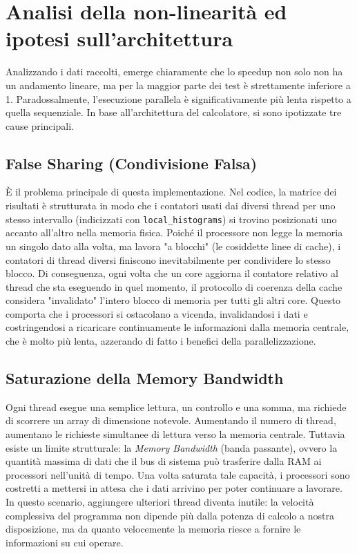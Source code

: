 \documentclass[a4paper,11pt]{article}
\begin{document}
\section{Analisi della non-linearità ed ipotesi sull'architettura}\label{sec:analysis}

Analizzando i dati raccolti, emerge chiaramente che lo speedup non solo non ha un andamento lineare, ma per la maggior parte dei test è strettamente inferiore a 1. Paradossalmente, l'esecuzione parallela è significativamente più lenta rispetto a quella sequenziale. 
In base all'architettura del calcolatore, si sono ipotizzate tre cause principali.

\subsection{False Sharing (Condivisione Falsa)}\label{sec:false_sharing}
    È il problema principale di questa implementazione. Nel codice, la matrice dei risultati è strutturata in modo che i contatori usati dai diversi thread per uno stesso intervallo (indicizzati con \texttt{local\_histograms\allowbreak[bin]\allowbreak[tid]}) si trovino posizionati uno accanto all'altro nella memoria fisica. Poiché il processore non legge la memoria un singolo dato alla volta, ma lavora "a blocchi" (le cosiddette linee di cache), i contatori di thread diversi finiscono inevitabilmente per condividere lo stesso blocco. Di conseguenza, ogni volta che un core aggiorna il contatore relativo al thread che sta eseguendo in quel momento, il protocollo di coerenza della cache considera "invalidato" l'intero blocco di memoria per tutti gli altri core. Questo comporta che i processori si ostacolano a vicenda, invalidandosi i dati e costringendosi a ricaricare continuamente le informazioni dalla memoria centrale, che è molto più lenta, azzerando di fatto i benefici della parallelizzazione.
    
    \subsection{Saturazione della Memory Bandwidth}\label{sec:memory_bandwidth} Ogni thread esegue una semplice lettura, un controllo e una somma, ma richiede di scorrere un array di dimensione notevole. Aumentando il numero di thread, aumentano le richieste simultanee di lettura verso la memoria centrale. Tuttavia esiste un limite strutturale: la \textit{Memory Bandwidth} (banda passante), ovvero la quantità massima di dati che il bus di sistema può trasferire dalla RAM ai processori nell'unità di tempo. Una volta saturata tale capacità, i processori sono costretti a mettersi in attesa che i dati arrivino per poter continuare a lavorare. In questo scenario, aggiungere ulteriori thread diventa inutile: la velocità complessiva del programma non dipende più dalla potenza di calcolo a nostra disposizione, ma da quanto velocemente la memoria riesce a fornire le informazioni su cui operare.
    
\end{document}

